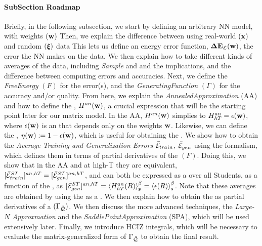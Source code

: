 \paragraph{SubSection Roadmap}
Briefly, in the following subsection,
we start by defining an arbitrary NN model, with weights $({\mathbf{w}})$
Then, we explain the difference between using real-world $({\mathbf{x}})$ and random $(\boldsymbol{\xi})$ data
This lets us define an energy error function, $\mathbf{\Delta {E}}_{\mathcal{L}}(\mathbf{w})$,
the error the NN makes on the data.
We then explain how to take different kinds of \emph{\Thermodynamic} averages of the data,
including \emph{Sample} and \emph{\ThermalAverages} and the implications,
and the difference between computing errors and accuracies.
Next, we define the \emph{FreeEnergy} $(F)$ for the error(s), and the \emph{GeneratingFunction}  $(\Gamma)$
for the accuracy and/or quality.
From here, we explain the \emph{AnnealedApproximation} (AA) and
how to define the  \emph{\AnnealedHamiltonian}, $H^{an}({\mathbf{w}})$, a crucial expression
that will be the starting point later for our matrix model.
In the AA, $H^{an}({\mathbf{w}})$ simplies to  $H^{an}_{hT}=\epsilon({\mathbf{w}})$, where $\epsilon({\mathbf{w}})$ is an \EffectivePotential
that depends only on the weights ${\mathbf{w}}$.
Likewise, we can define the \SelfOverlap, $\eta({\mathbf{w}}):=1-\epsilon({\mathbf{w}})$, which is useful for
obtaining the \Quality.
We show how to obtain the \emph{Average Training and Generalization Errors} $\bar{\mathcal{E}}_{train}$, $\bar{\mathcal{E}}_{gen}$
using the \STATMECH formalism, which defines them in terms of partial derivatives of the \FreeEnergy $(F)$.
Doing this, we show that in the AA and at high-T they are equivalent,
$[\bar{\mathcal{E}}^{ST}_{train}]^{an,hT}=[\bar{\mathcal{E}}^{ST}_{gen}]^{an,hT}$,
and can both be expressed as a \ThermalAverage over all Students, as a function 
of the \Teacher, as $[\bar{\mathcal{E}}^{ST}_{gen}]^{an,hT}=\left\langle H^{an}_{hT}(R) \right\rangle_{\mathbf s}^{\beta}=\left\langle \epsilon(R) \right\rangle_{\mathbf s}^{\beta}$.
Note that these averages are obtained by using the \FreeEnergy as a \GeneratingFunction.
We then explain how to obtain the \ModelQuality  as  partial derivatives of a
\emph{\GeneratingFunction} $(\Gamma_{\bar{\mathcal{Q}}})$.
We then discuss the more advanced techniques, the
\emph{Large-$N$ Approxmation} and the \emph{SaddlePointApproximation} (SPA),
which will be used extensively later.
Finally, we introduce  HCIZ integrals, which will be necessary to evaluate the matrix-generalized
form of $\Gamma_{\bar{\mathcal{Q}}}$ to obtain the final result.

